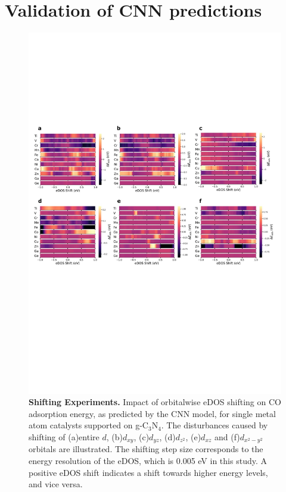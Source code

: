 

\section{Validation of CNN predictions}

\begin{figure}
    \centering
    \includegraphics[width=0.95\linewidth]{main_sections/figures/figure_5.JPG}
    \caption{\textbf{Shifting Experiments.}
    Impact of orbitalwise eDOS shifting on CO adsorption energy, as predicted by the CNN model, for single metal atom catalysts supported on g-$\mathrm{C_3N_4}$.
    The disturbances caused by shifting of (a)entire $d$, (b)$d_{xy}$, (c)$d_{yz}$, (d)$d_{z^2}$, (e)$d_{xz}$ and (f)$d_{x^2-y^2}$ orbitals are illustrated.
    The shifting step size corresponds to the energy resolution of the eDOS, which is 0.005 eV in this study.
    A positive eDOS shift indicates a shift towards higher energy levels, and vice versa.}
    \label{main_fig5:shifting}
\end{figure}

